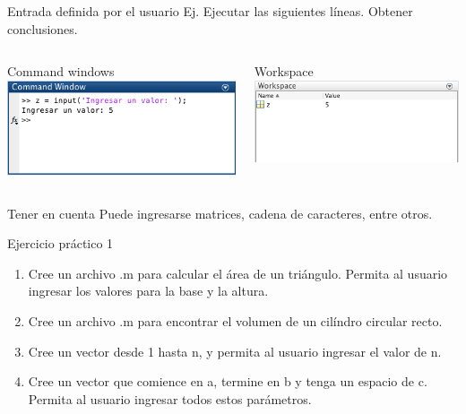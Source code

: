 \documentclass{bredelebeamer}
\begin{document}
\begin{frame}{Entrada definida por el usuario}
Ej. Ejecutar las siguientes líneas. Obtener conclusiones.
\begin{columns}
\begin{column}{0.5\textwidth}
\begin{center}
Command windows
\includegraphics[scale=0.3]{images/pantalla1.png}
\end{center}
\end{column}
\begin{column}{0.3\textwidth}
\begin{center}
Workspace
\includegraphics[scale=0.3]{images/pantalla2.png}
\end{center}
\end{column}
\end{columns}
\begin{block}{Tener en cuenta}
Puede ingresarse matrices, cadena de caracteres, entre otros.
\end{block}
\end{frame}

\begin{frame}{Ejercicio práctico 1}
\begin{enumerate}
\item Cree un archivo .m para calcular el área de un triángulo. Permita al usuario ingresar los valores para la base y la altura.
\item Cree un archivo .m para encontrar el volumen de un cilíndro circular recto.
\item Cree un vector desde 1 hasta n, y permita al usuario ingresar el valor de n.
\item Cree un vector que comience en a, termine en b y tenga un espacio de c. Permita al usuario ingresar todos estos parámetros.
\end{enumerate}
\end{frame}
\end{document}

